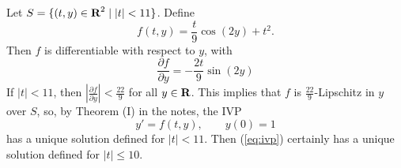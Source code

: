\documentclass{homework}
\begin{document}
	\maketitle
	
	\question Let $S = \{(t,y) \in \textbf{R}^2 \mid |t| < 11\}$. Define
	\begin{equation}
		f(t,y) = \frac{t}{9}\cos(2y) + t^2.
	\end{equation}
	Then $f$ is differentiable with respect to $y$, with
	\begin{equation}
		\frac{\partial f}{\partial y} = -\frac{2t}{9}\sin(2y)
	\end{equation}
	If $|t| < 11$, then $\left|\frac{\partial f}{\partial y}\right| <\frac{22}{9}$ for all $y \in \textbf{R}$. This implies that $f$ is $\frac{22}{9}$-Lipschitz in $y$ over $S$, so, by Theorem (I) in the notes, the IVP
	\begin{equation}
		\label{eq:ivp}
		y' = f(t,y), \qquad y(0) = 1
	\end{equation}
	has a unique solution defined for $|t| < 11$. Then (\ref{eq:ivp}) certainly has a unique solution defined for $|t| \le 10$.
	
	\question 
	
\end{document}
